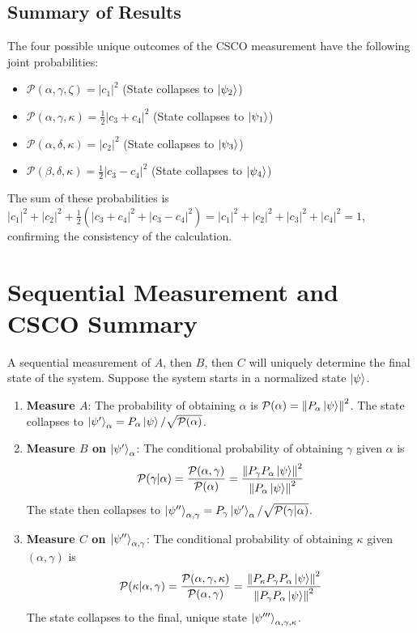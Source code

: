 \documentclass[11pt,a4paper]{article}
\begin{document}
  \subsection{Summary of Results}
  The four possible unique outcomes of the CSCO measurement have the following
  joint probabilities:
  \begin{itemize}
    \item $\mathcal{P}(\alpha, \gamma, \zeta) = |c_1|^2$  (State collapses to
      $\ket{\psi_2}$)
    \item $\mathcal{P}(\alpha, \gamma, \kappa) = \frac{1}{2}|c_3+c_4|^2$ (State
      collapses to $\ket{\psi_1}$)
    \item $\mathcal{P}(\alpha, \delta, \kappa) = |c_2|^2$ (State collapses to
      $\ket{\psi_3}$)
    \item $\mathcal{P}(\beta, \delta, \kappa) = \frac{1}{2}|c_3-c_4|^2$ (State
      collapses to $\ket{\psi_4}$)
  \end{itemize}
  The sum of these probabilities is $|c_1|^2 + |c_2|^2 +
  \frac{1}{2}(|c_3+c_4|^2+|c_3-c_4|^2) = |c_1|^2+|c_2|^2+|c_3|^2+|c_4|^2 = 1$,
  confirming the consistency of the calculation.

  \section{Sequential Measurement and CSCO Summary}

  A sequential measurement of $A$, then $B$, then $C$ will uniquely determine the
  final state of the system. Suppose the system starts in a normalized state
  $\ket{\psi}$.
  \begin{enumerate}
    \item \textbf{Measure $A$}: The probability of obtaining $\alpha$ is
      $\mathcal{P}(\alpha) = \norm{P_\alpha\ket{\psi}}^2$. The state collapses to
      $\ket{\psi'}_\alpha = P_\alpha\ket{\psi} / \sqrt{\mathcal{P}(\alpha)}$.
    \item \textbf{Measure $B$ on $\ket{\psi'}_\alpha$}: The conditional
      probability of obtaining $\gamma$ given $\alpha$ is
      $$ \mathcal{P}(\gamma|\alpha) =
      \frac{\mathcal{P}(\alpha,\gamma)}{\mathcal{P}(\alpha)} =
      \frac{\norm{P_\gamma P_\alpha \ket{\psi}}^2}{\norm{P_\alpha \ket{\psi}}^2}
      $$
      The state then collapses to $\ket{\psi''}_{\alpha,\gamma} = P_\gamma
      \ket{\psi'}_\alpha / \sqrt{\mathcal{P}(\gamma|\alpha)}$.
    \item \textbf{Measure $C$ on $\ket{\psi''}_{\alpha,\gamma}$}: The conditional
      probability of obtaining $\kappa$ given $(\alpha,\gamma)$ is
      $$ \mathcal{P}(\kappa|\alpha,\gamma) = \frac{\mathcal{P}(\alpha,\gamma,
      \kappa)}{\mathcal{P}(\alpha,\gamma)} = \frac{\norm{P_\kappa P_\gamma
      P_\alpha \ket{\psi}}^2}{\norm{P_\gamma P_\alpha \ket{\psi}}^2} $$
      The state collapses to the final, unique state
      $\ket{\psi'''}_{\alpha,\gamma,\kappa}$.
  \end{enumerate}
\end{document}
